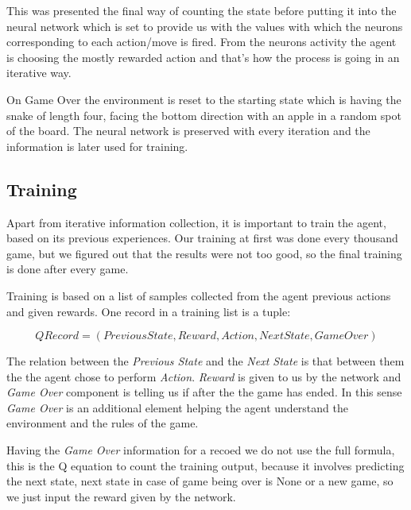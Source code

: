 \documentclass[]{article}
\begin{document}
\newpage

\par This was presented the final way of counting the state before putting it into the neural network which is set to provide us with the values with which the neurons corresponding to each action/move is fired. From the neurons activity the agent is choosing the mostly rewarded action and that's how the process is going in an iterative way. 

\par On Game Over the environment is reset to the starting state which is having the snake of length four, facing the bottom direction with an apple in a random spot of the board. The neural network is preserved with every iteration and the information is later used for training.

\subsection{Training}

\par Apart from iterative information collection, it is important to train the agent, based on its previous experiences. Our training at first was done every thousand game, but we figured out that the results were not too good, so the final training is done after every game.

\par Training is based on a list of samples collected from the agent previous actions and given rewards. One record in a training list is a tuple: 

\begin{equation}
QRecord = (Previous State, Reward, Action, Next State, Game Over)
\end{equation}

\par The relation between the \textit{Previous State} and the \textit{Next State} is that between them the the agent chose to perform \textit{Action}. \textit{Reward} is given to us by the network and \textit{Game Over} component is telling us if after the  the game has ended. In this sense \textit{Game Over} is an additional element helping the agent understand the environment and the rules of the game. 

\par Having the \textit{Game Over} information for a recoed we do not use the full formula, this is the Q equation to count the training output, because it involves predicting the next state, next state in case of game being over is None or a new game, so we just input the reward given by the network.
\end{document}

